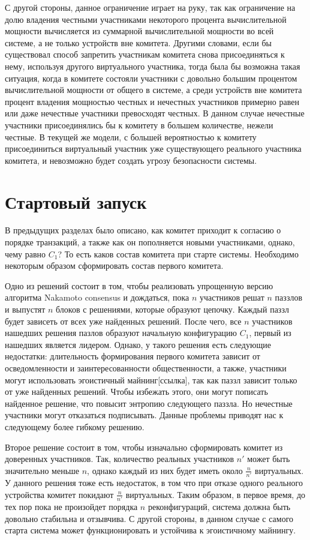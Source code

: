С другой стороны, данное ограничение играет на руку, так как ограничение на долю владения честными участниками некоторого процента вычислительной мощности вычисляется из суммарной вычислительной мощности во всей системе, а не только устройств вне комитета. Другими словами, если бы существовал способ запретить участникам комитета снова присоединяться к нему, используя другого виртуального участника, тогда была бы возможна такая ситуация, когда в комитете состояли участники с довольно большим процентом вычислительной мощности от общего в системе, а среди устройств вне комитета процент владения мощностью честных и нечестных участников примерно равен или даже нечестные участники превосходят честных. В данном случае нечестные участники присоединялись бы к комитету в большем количестве, нежели честные. В текущей же модели, с большей вероятностью к комитету присоединиться виртуальный участник уже существующего реального участника комитета, и невозможно будет создать угрозу безопасности системы.

\section{Стартовый запуск}
В предыдущих разделах было описано, как комитет приходит к согласию о порядке транзакций, а также как он пополняется новыми участниками, однако, чему равно $C_1$? То есть каков состав комитета при старте системы. Необходимо некоторым образом сформировать состав первого комитета.

Одно из решений состоит в том, чтобы реализовать упрощенную версию алгоритма Nakamoto consensus и дождаться, пока $n$ участников решат $n$ паззлов и выпустят $n$ блоков с решениями, которые образуют цепочку. Каждый паззл будет зависеть от всех уже найденных решений. После чего, все $n$ участников нашедших решения пазлов образуют начальную конфигурацию $C_1$, первый из нашедших является лидером.
Однако, у такого решения есть следующие недостатки: длительность формирования первого комитета зависит от осведомленности и заинтересованности общественности, а также, участники могут использовать эгоистичный майнинг[ссылка], так как паззл зависит только от уже найденных решений. Чтобы избежать этого, они могут пописать найденное решение, что повысит энтропию следующего паззла. Но нечестные участники могут отказаться подписывать. Данные проблемы приводят нас к следующему более гибкому решению.

Второе решение состоит в том, чтобы изначально сформировать комитет из доверенных участников. Так, количество реальных участников $n'$ может быть значительно меньше $n$, однако каждый из них будет иметь около $\frac{n}{n'}$ виртуальных. У данного решения тоже есть недостаток, в том что при отказе одного реального устройства комитет покидают $\frac{n}{n'}$ виртуальных. Таким образом, в первое время, до тех пор пока не произойдет порядка $n$ реконфигураций, система должна быть довольно стабильна и отзывчива.
С другой стороны, в данном случае с самого старта система может функционировать и устойчива к эгоистичному майнингу.

